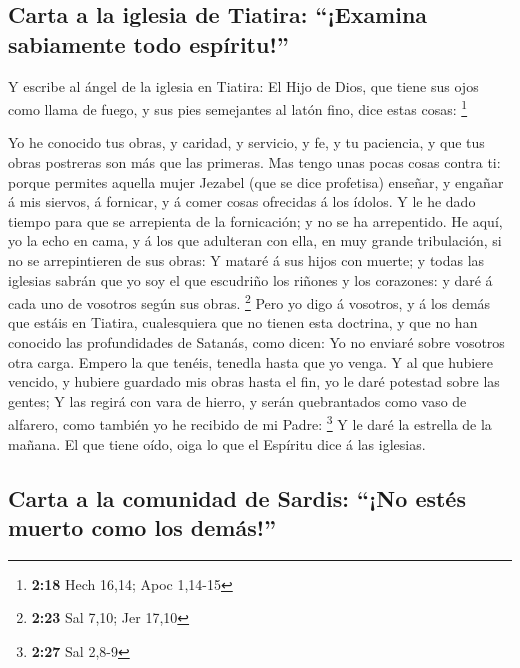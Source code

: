 \hypertarget{carta-a-la-iglesia-de-tiatira-examina-sabiamente-todo-espuxedritu}{%
\subsection{Carta a la iglesia de Tiatira: ``¡Examina sabiamente todo
espíritu!''}\label{carta-a-la-iglesia-de-tiatira-examina-sabiamente-todo-espuxedritu}}

 Y escribe al ángel de la iglesia en Tiatira: El Hijo de
Dios, que tiene sus ojos como llama de fuego, y sus pies semejantes al
latón fino, dice estas cosas: \footnote{\textbf{2:18} Hech 16,14; Apoc
  1,14-15}

 Yo he conocido tus obras, y caridad, y servicio, y fe, y
tu paciencia, y que tus obras postreras son más que las primeras.
 Mas tengo unas pocas cosas contra ti: porque permites
aquella mujer Jezabel (que se dice profetisa) enseñar, y engañar á mis
siervos, á fornicar, y á comer cosas ofrecidas á los ídolos.
 Y le he dado tiempo para que se arrepienta de la
fornicación; y no se ha arrepentido.  He aquí, yo la echo
en cama, y á los que adulteran con ella, en muy grande tribulación, si
no se arrepintieren de sus obras:  Y mataré á sus hijos
con muerte; y todas las iglesias sabrán que yo soy el que escudriño los
riñones y los corazones: y daré á cada uno de vosotros según sus obras.
\footnote{\textbf{2:23} Sal 7,10; Jer 17,10}  Pero yo
digo á vosotros, y á los demás que estáis en Tiatira, cualesquiera que
no tienen esta doctrina, y que no han conocido las profundidades de
Satanás, como dicen: Yo no enviaré sobre vosotros otra carga.
 Empero la que tenéis, tenedla hasta que yo venga.
 Y al que hubiere vencido, y hubiere guardado mis obras
hasta el fin, yo le daré potestad sobre las gentes;  Y
las regirá con vara de hierro, y serán quebrantados como vaso de
alfarero, como también yo he recibido de mi Padre: \footnote{\textbf{2:27}
  Sal 2,8-9}  Y le daré la estrella de la mañana.
 El que tiene oído, oiga lo que el Espíritu dice á las
iglesias.

\hypertarget{carta-a-la-comunidad-de-sardis-no-estuxe9s-muerto-como-los-demuxe1s}{%
\subsection{Carta a la comunidad de Sardis: ``¡No estés muerto como los
demás!''}\label{carta-a-la-comunidad-de-sardis-no-estuxe9s-muerto-como-los-demuxe1s}}

